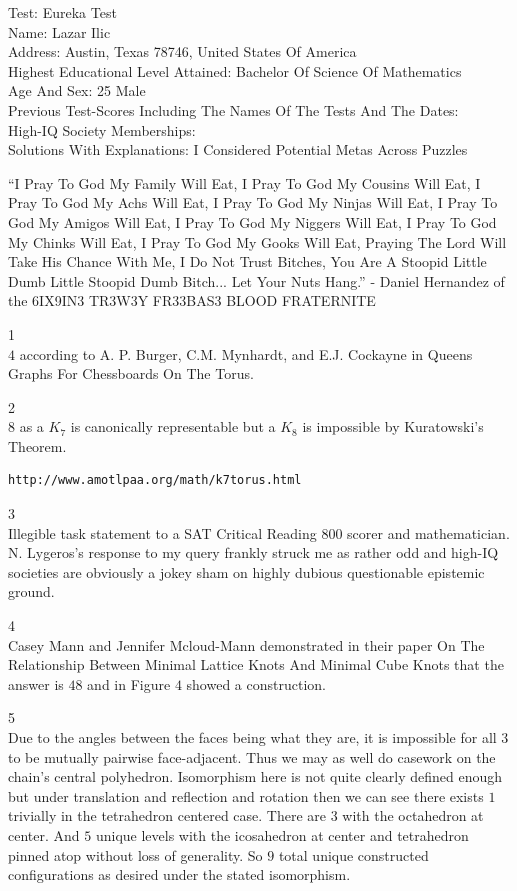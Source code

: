 Test: Eureka Test \\
Name: Lazar Ilic \\
Address: Austin, Texas 78746, United States Of America \\
Highest Educational Level Attained: Bachelor Of Science Of Mathematics \\
Age And Sex: 25 Male \\
Previous Test-Scores Including The Names Of The Tests And The Dates: \\
High-IQ Society Memberships: \\
Solutions With Explanations: I Considered Potential Metas Across Puzzles

``I Pray To God My Family Will Eat, I Pray To God My Cousins Will Eat, I Pray To God My Achs Will Eat, I Pray To God My Ninjas Will Eat, I Pray To God My Amigos Will Eat, I Pray To God My Niggers Will Eat, I Pray To God My Chinks Will Eat, I Pray To God My Gooks Will Eat, Praying The Lord Will Take His Chance With Me, I Do Not Trust Bitches, You Are A Stoopid Little Dumb Little Stoopid Dumb Bitch... Let Your Nuts Hang.'' - Daniel Hernandez of the 6IX9IN3 TR3W3Y FR33BAS3 BLOOD FRATERNITE

1 \\
$\boxed{4}$ according to A. P. Burger, C.M. Mynhardt, and E.J. Cockayne in Queens Graphs For Chessboards On The Torus.

2 \\
$\boxed{8}$ as a $K_7$ is canonically representable but a $K_8$ is impossible by Kuratowski's Theorem.

\begin{verbatim}
http://www.amotlpaa.org/math/k7torus.html
\end{verbatim}

3 \\
Illegible task statement to a SAT Critical Reading $800$ scorer and mathematician. N. Lygeros's response to my query frankly struck me as rather odd and high-IQ societies are obviously a jokey sham on highly dubious questionable epistemic ground.

4 \\
Casey Mann and Jennifer Mcloud-Mann demonstrated in their paper On The Relationship Between Minimal Lattice Knots And Minimal Cube Knots that the answer is $\boxed{48}$ and in Figure $4$ showed a construction.

5 \\
Due to the angles between the faces being what they are, it is impossible for all $3$ to be mutually pairwise face-adjacent. Thus we may as well do casework on the chain's central polyhedron. Isomorphism here is not quite clearly defined enough but under translation and reflection and rotation then we can see there exists $1$ trivially in the tetrahedron centered case. There are $3$ with the octahedron at center. And $5$ unique levels with the icosahedron at center and tetrahedron pinned atop without loss of generality. So $\boxed{9}$ total unique constructed configurations as desired under the stated isomorphism.

